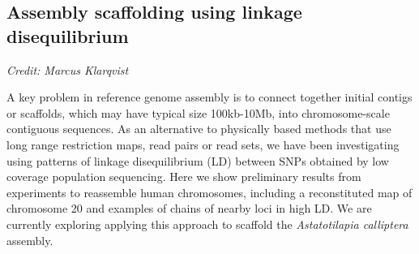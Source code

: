 \documentclass[a0,portrait]{a0poster}
\begin{document}
\begin{multicols}{2}


\section*{Assembly scaffolding using linkage disequilibrium}

\emph{Credit: Marcus Klarqvist}

\vspace{0.5cm}

\noindent A key problem in reference genome assembly is to connect together initial contigs or scaffolds, which may have typical size 100kb-10Mb, into chromosome-scale contiguous sequences. As an alternative to physically based methods that use long range restriction maps, read pairs or read sets, we have been investigating using patterns of linkage disequilibrium (LD) between SNPs obtained by low coverage population sequencing. Here we show preliminary results from experiments to reassemble human chromosomes, including a reconstituted map of chromosome 20 and examples of chains of nearby loci in high LD. We are currently exploring applying this approach to scaffold the \emph{Astatotilapia calliptera} assembly.



\end{multicols}
\end{document}
